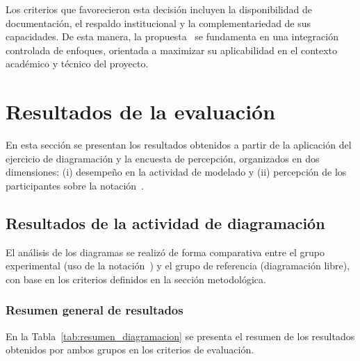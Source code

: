 Los criterios que favorecieron esta decisión incluyen la disponibilidad de documentación, el respaldo institucional y la complementariedad de sus capacidades. De esta manera, la propuesta \NDITI~se fundamenta en una integración controlada de enfoques, orientada a maximizar su aplicabilidad en el contexto académico y técnico del proyecto.

\section{Resultados de la evaluación}
\noindent
En esta sección se presentan los resultados obtenidos a partir de la aplicación del ejercicio de diagramación y la encuesta de percepción, organizados en dos dimensiones: (i) desempeño en la actividad de modelado y (ii) percepción de los participantes sobre la notación~\NDITI.

\subsection{Resultados de la actividad de diagramación}
\noindent
El análisis de los diagramas se realizó de forma comparativa entre el grupo experimental (uso de la notación~\NDITI) y el grupo de referencia (diagramación libre), con base en los criterios definidos en la sección metodológica.

\subsubsection{Resumen general de resultados}
\noindent
En la Tabla~\ref{tab:resumen_diagramacion} se presenta el resumen de los resultados obtenidos por ambos grupos en los criterios de evaluación.

